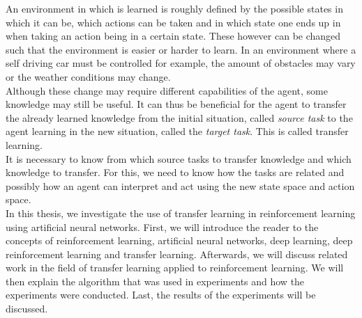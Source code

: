 An environment in which is learned is roughly defined by the possible states in which it can be, which actions can be taken and in which state one ends up in when taking an action being in a certain state.
These however can be changed such that the environment is easier or harder to learn. In an environment where a self driving car must be controlled for example, the amount of obstacles may vary or the weather conditions may change.\\
Although these change may require different capabilities of the agent, some knowledge may still be useful. It can thus be beneficial for the agent to transfer the already learned knowledge from the initial situation, called \textit{source task} to the agent learning in the new situation, called the \textit{target task}. This is called transfer learning.\\
It is necessary to know from which source tasks to transfer knowledge and which knowledge to transfer. For this, we need to know how the tasks are related and possibly how an agent can interpret and act using the new state space and action space.\\

In this thesis, we investigate the use of transfer learning in reinforcement learning using artificial neural networks. First, we will introduce the reader to the concepts of reinforcement learning, artificial neural networks, deep learning, deep reinforcement learning and transfer learning. Afterwards, we will discuss related work in the field of transfer learning applied to reinforcement learning. We will then explain the algorithm that was used in experiments and how the experiments were conducted. Last, the results of the experiments will be discussed.